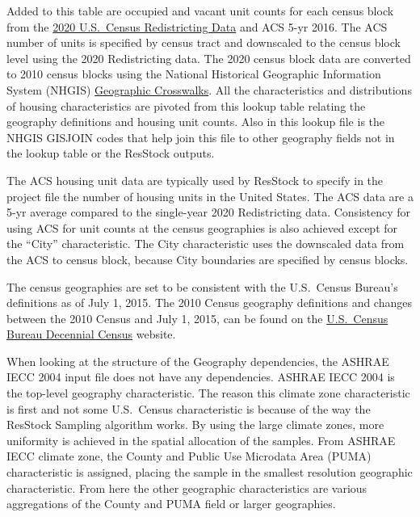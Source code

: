 Added to this table are occupied and vacant unit counts for each census block from the \href{https://www.census.gov/programs-surveys/decennial-census/about/rdo.html}{2020 U.S.~Census Redistricting Data} and ACS 5-yr 2016. The ACS number of units is specified by census tract and downscaled to the census block level using the 2020 Redistricting data. The 2020 census block data are converted to 2010 census blocks using the National Historical Geographic Information System (NHGIS) \href{https://www.nhgis.org/geographic-crosswalks}{Geographic Crosswalks}. All the characteristics and distributions of housing characteristics are pivoted from this lookup table relating the geography definitions and housing unit counts. Also in this lookup file is the NHGIS GISJOIN codes that help join this file to other geography fields not in the lookup table or the ResStock outputs.

The ACS housing unit data are typically used by ResStock to specify in the project file the number of housing units in the United States. The ACS data are a 5-yr average compared to the single-year 2020 Redistricting data. Consistency for using ACS for unit counts at the census geographies is also achieved except for the ``City'' characteristic. The City characteristic uses the downscaled data from the ACS to census block, because City boundaries are specified by census blocks. 

The census geographies are set to be consistent with the U.S.~Census Bureau's definitions as of July 1, 2015. The 2010 Census geography definitions and changes between the 2010 Census and July 1, 2015, can be found on the \href{https://www.census.gov/programs-surveys/decennial-census/decade.html}{U.S.~Census Bureau Decennial Census} website.

When looking at the structure of the Geography dependencies, the ASHRAE IECC 2004 input file does not have any dependencies. ASHRAE IECC 2004 is the top-level geography characteristic. The reason this climate zone characteristic is first and not some U.S.~Census characteristic is because of the way the ResStock Sampling algorithm works. By using the large climate zones, more uniformity is achieved in the spatial allocation of the samples. From ASHRAE IECC climate zone, the County and Public Use Microdata Area (PUMA) characteristic is assigned, placing the sample in the smallest resolution geographic characteristic. From here the other geographic characteristics are various aggregations of the County and PUMA field or larger geographies.

